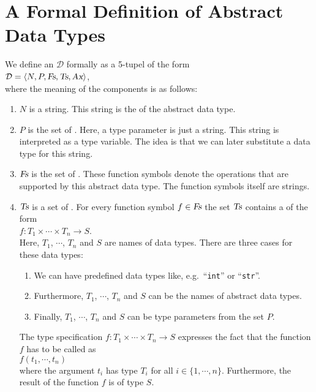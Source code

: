 \section[Formal Definition]{A Formal Definition of Abstract Data Types}
We define an  $\mathcal{D}$ formally as a 5-tupel of the form 
\\[0.2cm]
\hspace*{1.3cm}
 $\mathcal{D} = \langle N, P, \textsl{Fs}, \textsl{Ts}, \textsl{Ax} \rangle$,
\\[0.2cm] 
where the meaning of the components is as follows:
\begin{enumerate}
\item $N$ is a string.  This string is the  of the abstract data type.
\item $P$ is the set of .   Here, a type parameter is just a string.
      This string is interpreted as a type variable.  The idea is that we can later substitute 
      a data type for this string.
\item $\textsl{Fs}$ is the set of .  These function symbols denote the 
      operations that are supported by this abstract data type. The function symbols itself are strings.
\item $\textsl{Ts}$ is a set of .  For every function symbol
      $f \in \textsl{Fs}$
      the set $\textsl{Ts}$ contains a  of the form 
      \\[0.2cm]
      \hspace*{1.3cm} 
      $f: T_1 \times \cdots \times T_n \rightarrow S$. 
      \\[0.2cm]
      Here,  $T_1$, $\cdots$, $T_n$ and $S$ are names of data types.  There are three cases for
      these data types: 
      \begin{enumerate}
      \item We can have predefined data types like, e.g.~``\texttt{int}'' or ``\texttt{str}''.
      \item Furthermore, $T_1$, $\cdots$, $T_n$ and $S$ can be the names of abstract data types.
      \item Finally,  $T_1$, $\cdots$, $T_n$ and $S$ can be type parameters from the set $P$.
      \end{enumerate}
      The type specification $f: T_1 \times \cdots \times T_n \rightarrow S$ expresses the fact that
      the function $f$ has to be called as \\[0.2cm] 
      \hspace*{1.3cm}
      $f(t_1,\cdots,t_n)$ 
      \\[0.2cm]
      where the argument $t_i$ has type $T_i$ for all $i \in \{1,\cdots,n\}$.
      Furthermore, the result of the function $f$ is of type $S$.


\end{enumerate}

